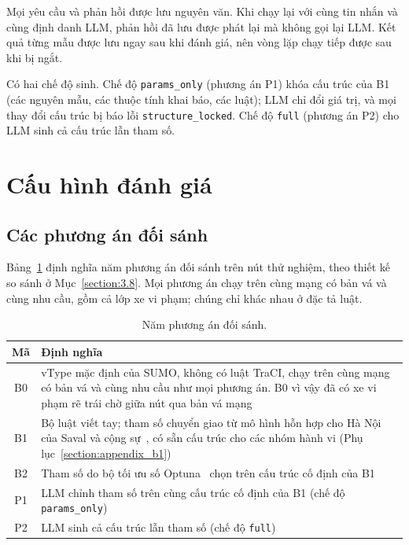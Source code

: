 \documentclass[../main.tex]{subfiles}
\begin{document}
Mọi yêu cầu và phản hồi được lưu nguyên văn. Khi chạy lại với cùng tin nhắn và cùng định danh LLM, phản hồi đã lưu được phát lại mà không gọi lại LLM. Kết quả từng mẫu được lưu ngay sau khi đánh giá, nên vòng lặp chạy tiếp được sau khi bị ngắt.

Có hai chế độ sinh. Chế độ \texttt{params\_only} (phương án P1) khóa cấu trúc của B1 (các nguyên mẫu, các thuộc tính khai báo, các luật); LLM chỉ đổi giá trị, và mọi thay đổi cấu trúc bị báo lỗi \texttt{structure\_locked}. Chế độ \texttt{full} (phương án P2) cho LLM sinh cả cấu trúc lẫn tham số.

\section{Cấu hình đánh giá}
\label{section:ex_config}

\subsection{Các phương án đối sánh}

Bảng~\ref{table:3.4} định nghĩa năm phương án đối sánh trên nút thử nghiệm, theo thiết kế so sánh ở Mục~\ref{section:3.8}. Mọi phương án chạy trên cùng mạng có bản vá và cùng nhu cầu, gồm cả lớp xe vi phạm; chúng chỉ khác nhau ở đặc tả luật.

\begin{table}[!htbp]
\centering
\small
\caption{Năm phương án đối sánh.}
\label{table:3.4}
\begin{tabular}{|c|>{\raggedright\arraybackslash}p{12.5cm}|}
\hline
\textbf{Mã} & \textbf{Định nghĩa} \\
\hline
B0 & vType mặc định của SUMO, không có luật TraCI, chạy trên cùng mạng có bản vá và cùng nhu cầu như mọi phương án. B0 vì vậy đã có xe vi phạm rẽ trái chờ giữa nút qua bản vá mạng \\
\hline
B1 & Bộ luật viết tay; tham số chuyển giao từ mô hình hỗn hợp cho Hà Nội của Saval và cộng sự~\cite{saval2023mixed}, có sẵn cấu trúc cho các nhóm hành vi (Phụ lục~\ref{section:appendix_b1}) \\
\hline
B2 & Tham số do bộ tối ưu số Optuna~\cite{akiba2019optuna} chọn trên cấu trúc cố định của B1 \\
\hline
P1 & LLM chỉnh tham số trên cùng cấu trúc cố định của B1 (chế độ \texttt{params\_only}) \\
\hline
P2 & LLM sinh cả cấu trúc lẫn tham số (chế độ \texttt{full}) \\
\hline
\end{tabular}
\end{table}
\end{document}

